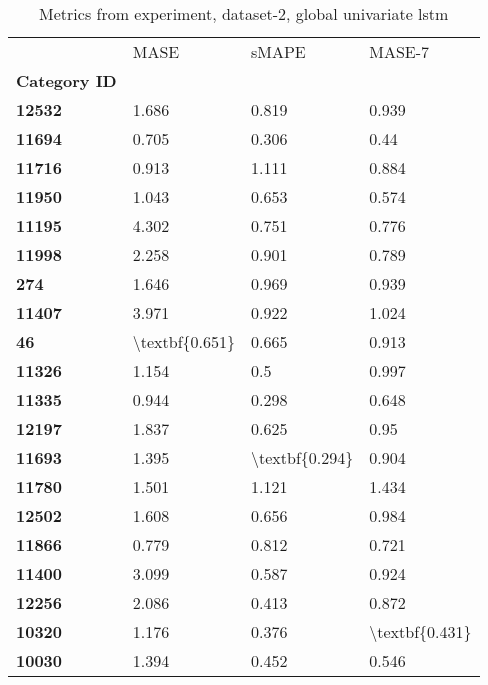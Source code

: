 \begin{table}[h]
\centering
\caption{Metrics from experiment, dataset-2, global univariate lstm}
\label{table:global-univariate-lstm-dataset-2}
\begin{tabular}{llll}
\toprule
{} &            MASE &           sMAPE &          MASE-7 \\
\textbf{Category ID} &                 &                 &                 \\
\midrule
\textbf{12532      } &           1.686 &           0.819 &           0.939 \\
\textbf{11694      } &           0.705 &           0.306 &            0.44 \\
\textbf{11716      } &           0.913 &           1.111 &           0.884 \\
\textbf{11950      } &           1.043 &           0.653 &           0.574 \\
\textbf{11195      } &           4.302 &           0.751 &           0.776 \\
\textbf{11998      } &           2.258 &           0.901 &           0.789 \\
\textbf{274        } &           1.646 &           0.969 &           0.939 \\
\textbf{11407      } &           3.971 &           0.922 &           1.024 \\
\textbf{46         } &  \textbackslash textbf\{0.651\} &           0.665 &           0.913 \\
\textbf{11326      } &           1.154 &             0.5 &           0.997 \\
\textbf{11335      } &           0.944 &           0.298 &           0.648 \\
\textbf{12197      } &           1.837 &           0.625 &            0.95 \\
\textbf{11693      } &           1.395 &  \textbackslash textbf\{0.294\} &           0.904 \\
\textbf{11780      } &           1.501 &           1.121 &           1.434 \\
\textbf{12502      } &           1.608 &           0.656 &           0.984 \\
\textbf{11866      } &           0.779 &           0.812 &           0.721 \\
\textbf{11400      } &           3.099 &           0.587 &           0.924 \\
\textbf{12256      } &           2.086 &           0.413 &           0.872 \\
\textbf{10320      } &           1.176 &           0.376 &  \textbackslash textbf\{0.431\} \\
\textbf{10030      } &           1.394 &           0.452 &           0.546 \\
\bottomrule
\end{tabular}
\end{table}
